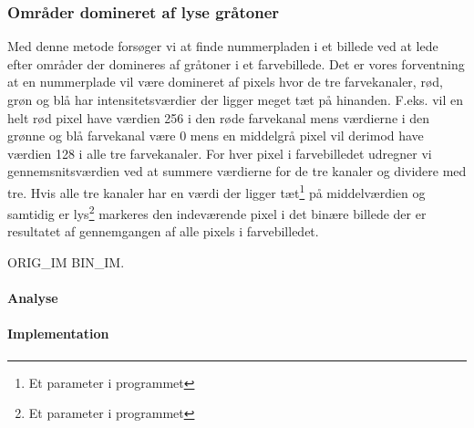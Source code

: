 \subsubsection*{Områder domineret af lyse gråtoner}
Med denne metode forsøger vi at finde nummerpladen i et billede ved at lede efter områder der domineres af gråtoner i et farvebillede. Det er vores forventning at en nummerplade vil være domineret af pixels hvor de tre farvekanaler, rød, grøn og blå har intensitetsværdier der ligger meget tæt på hinanden. F.eks. vil en helt rød pixel have værdien 256 i den røde farvekanal mens værdierne i den grønne og blå farvekanal være 0 mens en middelgrå pixel vil derimod have værdien 128 i alle tre farvekanaler. For hver pixel i farvebilledet udregner vi gennemsnitsværdien ved at summere værdierne for de tre kanaler og dividere med tre. Hvis alle tre kanaler har en værdi der ligger tæt\footnote{Et parameter i programmet} på middelværdien og samtidig er lys\footnote{Et parameter i programmet} markeres den indeværende pixel i det binære billede der er resultatet af gennemgangen af alle pixels i farvebilledet.

ORIG_IM BIN_IM.
\paragraph*{Analyse}
\paragraph*{Implementation}
 

